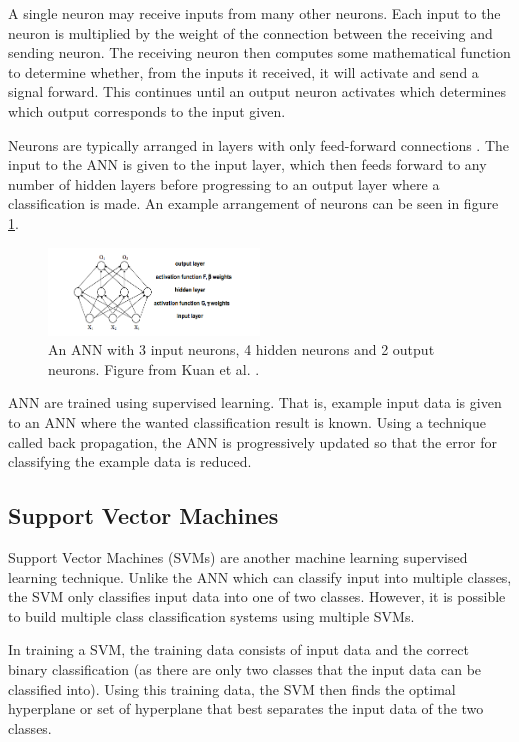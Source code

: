 A single neuron may receive inputs from many other neurons. Each input to the neuron is multiplied by the weight of the connection between the receiving and sending neuron. The receiving neuron then computes some mathematical function to determine whether, from the inputs it received, it will activate and send a signal forward. This continues until an output neuron activates which determines which output corresponds to the input given. 

Neurons are typically arranged in layers with only feed-forward connections \cite{Kuan}. The input to the ANN is given to the input layer, which then feeds forward to any number of hidden layers before progressing to an output layer where a classification is made. An example arrangement of neurons can be seen in figure \ref{ANN}. 

\begin{figure}[H]
\begin{center}
\leavevmode
\includegraphics[width=0.5\textwidth]{images/ANN.png}
\end{center}
\caption{An ANN with 3 input neurons, 4 hidden neurons and 2 output neurons. Figure from Kuan et al. \cite{Kuan}.}
\label{ANN}
\end{figure}

ANN are trained using supervised learning. That is, example input data is given to an ANN where the wanted classification result is known. Using a technique called back propagation, the ANN is progressively updated so that the error for classifying the example data is reduced.  


\subsection{Support Vector Machines}
\label{SVMAppendix}

Support Vector Machines (SVMs) are another machine learning supervised learning technique. Unlike the ANN which can classify input into multiple classes, the SVM only classifies input data into one of two classes. However, it is possible to build  multiple class classification systems using multiple SVMs. 

In training a SVM, the training data consists of input data and the correct binary classification (as there are only two classes that the input data can be classified into).  Using this training data, the SVM then finds the optimal hyperplane or set of hyperplane that best separates the input data of the two classes.  \cite{Jordan2008}


